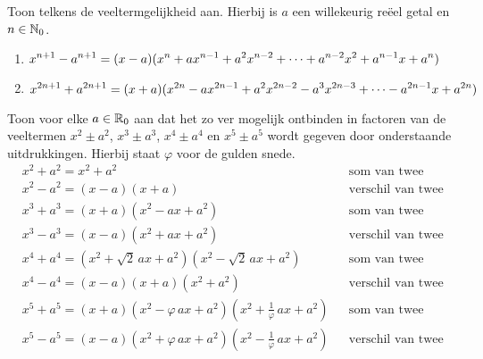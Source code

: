 \documentclass{ximera}
\begin{document}
\begin{Uitbreiding}
\begin{Oefening}
Toon telkens de veeltermgelijkheid aan. Hierbij is $a$ een willekeurig reëel getal en $n \in \mathbb{N}_0$.
\begin{enumerate}

\item
$\displaystyle x^{n+1} - a^{n+1} = (x-a)(x^{n} + ax^{n-1} + a^2x^{n-2} + \dots + a^{n-2}x^2 + a^{n-1}x + a^{n})$
\item
$\displaystyle x^{2n+1} + a^{2n+1} = (x+a)(x^{2n} - ax^{2n-1} + a^2x^{2n-2} - a^3x^{2n-3} + \dots - a^{2n-1}x + a^{2n})$
\end{enumerate}
\end{Oefening}

\begin{Oefening}
\label{somtweevierdemachten}
Toon voor elke $a \in \mathbb{R}_0$ aan dat het zo ver mogelijk ontbinden in factoren van de veeltermen $x^2 \pm a^2$, $x^3 \pm a^3$, $x^4 \pm a^4$ en  $x^5 \pm a^5$ wordt gegeven door onderstaande uitdrukkingen. Hierbij staat $\varphi$ voor de gulden snede. %
\begin{align*}
& x^2 + a^2 = x^2 + a^2 && \text{som van twee kwadraten} \\
& x^2 - a^2 = (x-a)(x+a) && \text{verschil van twee kwadraten} \\
& x^3 + a^3 = (x+a)(x^2 - ax + a^2) && \text{som van twee derde machten} \\
& x^3 - a^3 = (x-a)(x^2 + ax + a^2) && \text{verschil van twee derde machten} \\
& x^4 + a^4 = (x^2 + \sqrt{2}\,ax + a^2)(x^2 - \sqrt{2}\,ax + a^2) && \text{som van twee vierde machten} \\
& x^4 - a^4 = (x-a)(x+a)(x^2+a^2) && \text{verschil van twee vierde machten} \\
& x^5 + a^5 = (x+a)(x^2-\varphi\,ax + a^2)(x^2+\frac{1}{\varphi}\,ax + a^2) && \text{som van twee vijfde machten} \\
& x^5 - a^5 = (x-a)(x^2+\varphi\,ax + a^2)(x^2-\frac{1}{\varphi}\,ax + a^2) && \text{verschil van twee vijfde machten}
\end{align*}
\end{Oefening}


\end{Uitbreiding}
\end{document}
